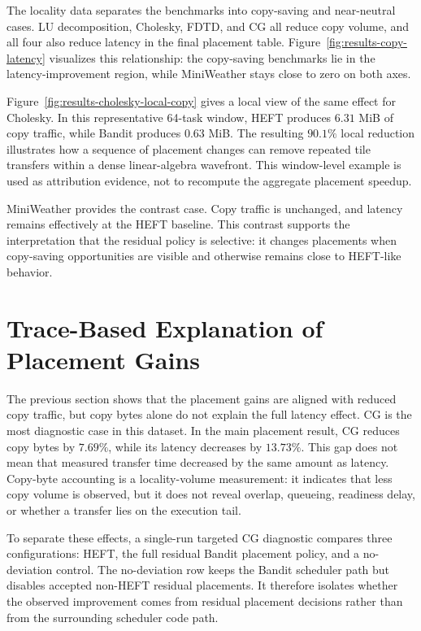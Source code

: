 \figCopyLatencyScatter

\figCholeskyLocalCopyFootprint

The locality data separates the benchmarks into copy-saving and near-neutral
cases. LU decomposition, Cholesky, FDTD, and CG all reduce copy volume, and all
four also reduce latency in the final placement table.
Figure~\ref{fig:results-copy-latency} visualizes this relationship: the
copy-saving benchmarks lie in the latency-improvement region, while
MiniWeather stays close to zero on both axes.

Figure~\ref{fig:results-cholesky-local-copy} gives a local view of the same
effect for Cholesky. In this representative 64-task window, HEFT produces
\(6.31\) MiB of copy traffic, while Bandit produces \(0.63\) MiB. The resulting
\(90.1\%\) local reduction illustrates how a sequence of placement changes can
remove repeated tile transfers within a dense linear-algebra wavefront. This
window-level example is used as attribution evidence, not to recompute the
aggregate placement speedup.

MiniWeather provides the contrast case. Copy traffic is unchanged, and latency
remains effectively at the HEFT baseline. This contrast supports the
interpretation that the residual policy is selective: it changes placements
when copy-saving opportunities are visible and otherwise remains close to
HEFT-like behavior.

\section{Trace-Based Explanation of Placement Gains}
\label{sec:results-trace-locality-mechanism}

The previous section shows that the placement gains are aligned with reduced
copy traffic, but copy bytes alone do not explain the full latency effect. CG is
the most diagnostic case in this dataset. In the main placement result, CG
reduces copy bytes by \(7.69\%\), while its latency decreases by \(13.73\%\).
This gap does not mean that measured transfer time decreased by the same amount
as latency. Copy-byte accounting is a locality-volume measurement: it indicates
that less copy volume is observed, but it does not reveal overlap, queueing,
readiness delay, or whether a transfer lies on the execution tail.

To separate these effects, a single-run targeted CG diagnostic compares three
configurations: HEFT, the full residual Bandit placement policy, and a
no-deviation control. The no-deviation row keeps the Bandit scheduler path but
disables accepted non-HEFT residual placements. It therefore isolates whether
the observed improvement comes from residual placement decisions rather than
from the surrounding scheduler code path.

